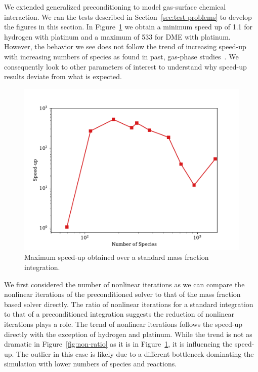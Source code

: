 \documentclass[12pt]{ussci}
\begin{document}
We extended generalized preconditioning to model gas-surface chemical interaction.
We ran the tests described in Section~\ref{sec:test-problems} to develop the figures in this section.
In Figure~\ref{fig:speed-up} we obtain a minimum speed up of 1.1 for hydrogen with platinum and a maximum of 533 for DME with platinum.
However, the behavior we see does not follow the trend of increasing speed-up with increasing numbers of species as found in past, gas-phase studies~\cite{walker2022generalized}.
We consequently look to other parameters of interest to understand why speed-up results deviate from what is expected.

\begin{figure}[htbp]
    \centering
    \includegraphics[scale=0.65]{figures/speed-up.pdf}
    \caption{Maximum speed-up obtained over a standard mass fraction integration.}
    \label{fig:speed-up}
\end{figure}

We first considered the number of nonlinear iterations as we can compare the nonlinear iterations of the preconditioned solver to that of the mass fraction based solver directly.
The ratio of nonlinear iterations for a standard integration to that of a preconditioned integration suggests the reduction of nonlinear iterations plays a role.
The trend of nonlinear iterations follows the speed-up directly with the exception of hydrogen and platinum.
While the trend is not as dramatic in Figure~\ref{fig:non-ratio} as it is in Figure~\ref{fig:speed-up}, it is influencing the speed-up.
The outlier in this case is likely due to a different bottleneck dominating the simulation with lower numbers of species and reactions.
\end{document}
